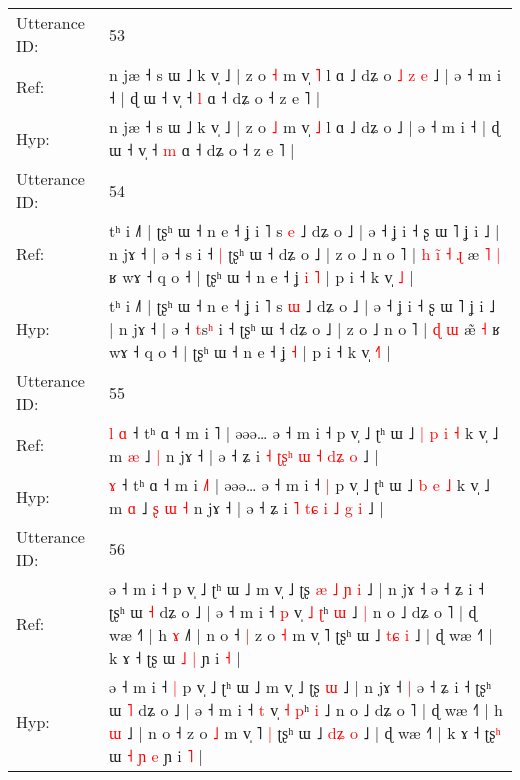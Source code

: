 \documentclass[10pt]{article}
\DeclareRobustCommand{\hl}[1]{{\textcolor{red}{#1}}}
\begin{document}
\begin{longtable}{ll}
 \\
\midrule
Utterance ID: & 53 \\
Ref: & n jæ ˧ s ɯ ˩ k v̩ ˩ | z o \hl{˧} m v̩ \hl{˥} l ɑ ˩ dʑ o\hl{ }\hl{˩}\hl{ }\hl{z}\hl{ }\hl{e} ˩ | ə ˧ m i ˧ | ɖ ɯ ˧ v̩ ˧ \hl{l} ɑ ˧ dʑ o ˧ z e ˥ |
 \\
Hyp: & n jæ ˧ s ɯ ˩ k v̩ ˩ | z o \hl{˩} m v̩ \hl{˩} l ɑ ˩ dʑ o\hl{}\hl{}\hl{}\hl{}\hl{}\hl{} ˩ | ə ˧ m i ˧ | ɖ ɯ ˧ v̩ ˧ \hl{m} ɑ ˧ dʑ o ˧ z e ˥ |
 \\
\midrule
Utterance ID: & 54 \\
Ref: & tʰ i ˩˥ | ʈʂʰ ɯ ˧ n e ˧ ʝ i ˥ s \hl{e} ˩ dʑ o ˩ | ə ˧ ʝ i ˧ ʂ ɯ ˥ ʝ i ˩ | n jɤ ˧ | ə ˧ \hl{}s\hl{} i ˧\hl{ }\hl{|} ʈʂʰ ɯ ˧ dʑ o ˩ | z o ˩ n o ˥ |\hl{ }\hl{h}\hl{ }\hl{i}\hl{̃} \hl{˧} \hl{ɻ} æ\hl{ }\hl{˥} \hl{|} ʁ wɤ ˧ q o ˧ | ʈʂʰ ɯ ˧ n e ˧ ʝ\hl{ }\hl{i} \hl{˥} | p i ˧ k v̩ \hl{}\hl{˩} |
 \\
Hyp: & tʰ i ˩˥ | ʈʂʰ ɯ ˧ n e ˧ ʝ i ˥ s \hl{ɯ} ˩ dʑ o ˩ | ə ˧ ʝ i ˧ ʂ ɯ ˥ ʝ i ˩ | n jɤ ˧ | ə ˧ \hl{t}s\hl{ʰ} i ˧\hl{}\hl{} ʈʂʰ ɯ ˧ dʑ o ˩ | z o ˩ n o ˥ |\hl{}\hl{}\hl{}\hl{}\hl{} \hl{ɖ} \hl{ɯ} æ\hl{}\hl{̃} \hl{˧} ʁ wɤ ˧ q o ˧ | ʈʂʰ ɯ ˧ n e ˧ ʝ\hl{}\hl{} \hl{˧} | p i ˧ k v̩ \hl{˧}\hl{˥} |
 \\
\midrule
Utterance ID: & 55 \\
Ref: & \hl{l}\hl{ }\hl{ɑ} ˧ tʰ ɑ ˧ m i \hl{}˥ | əəə… ə ˧ m i ˧\hl{}\hl{} p v̩ ˩ ʈʰ ɯ ˩\hl{ }\hl{|} \hl{p} \hl{i} \hl{˧} k v̩ ˩ m \hl{æ} ˩\hl{}\hl{}\hl{}\hl{} \hl{|} n jɤ ˧ | ə ˧ ʑ i \hl{˧} \hl{ʈ}\hl{ʂ}\hl{ʰ} \hl{ɯ} \hl{˧} \hl{d}\hl{ʑ} \hl{o} ˩ |
 \\
Hyp: & \hl{}\hl{}\hl{ɤ} ˧ tʰ ɑ ˧ m i \hl{˩}˥ | əəə… ə ˧ m i ˧\hl{ }\hl{|} p v̩ ˩ ʈʰ ɯ ˩\hl{}\hl{} \hl{b} \hl{e} \hl{˩} k v̩ ˩ m \hl{ɑ} ˩\hl{ }\hl{ʂ}\hl{ }\hl{ɯ} \hl{˧} n jɤ ˧ | ə ˧ ʑ i \hl{˥} \hl{}\hl{t}\hl{ɕ} \hl{i} \hl{˩} \hl{}\hl{g} \hl{i} ˩ |
 \\
\midrule
Utterance ID: & 56 \\
Ref: & ə ˧ m i ˧\hl{}\hl{} p v̩ ˩ ʈʰ ɯ ˩ m v̩ ˩ ʈʂ\hl{ }\hl{æ}\hl{ }\hl{˩}\hl{ }\hl{ɲ} \hl{i} ˩ | n jɤ ˧\hl{}\hl{} ə ˧ ʑ i ˧ ʈʂʰ ɯ \hl{˧} dʑ o ˩ | ə ˧ m i ˧ \hl{p} v̩ \hl{˩} \hl{ʈ}ʰ \hl{ɯ} ˩\hl{ }\hl{|} n o ˩ dʑ o ˥ | ɖ wæ ˧˥ | h \hl{ɤ} ˩\hl{˥} | n o ˧\hl{ }\hl{|} z o \hl{˧} m v̩ ˥\hl{}\hl{} ʈʂʰ ɯ ˩ \hl{t}\hl{ɕ} \hl{i} ˩ | ɖ wæ ˧˥ | k ɤ ˧ ʈʂ\hl{} ɯ\hl{}\hl{} \hl{˩} \hl{|} ɲ i \hl{˧} |
 \\
Hyp: & ə ˧ m i ˧\hl{ }\hl{|} p v̩ ˩ ʈʰ ɯ ˩ m v̩ ˩ ʈʂ\hl{}\hl{}\hl{}\hl{}\hl{}\hl{} \hl{ɯ} ˩ | n jɤ ˧\hl{ }\hl{|} ə ˧ ʑ i ˧ ʈʂʰ ɯ \hl{˥} dʑ o ˩ | ə ˧ m i ˧ \hl{t} v̩ \hl{˧} \hl{p}ʰ \hl{i} ˩\hl{}\hl{} n o ˩ dʑ o ˥ | ɖ wæ ˧˥ | h \hl{ɯ} ˩\hl{} | n o ˧\hl{}\hl{} z o \hl{˩} m v̩ ˥\hl{ }\hl{|} ʈʂʰ ɯ ˩ \hl{d}\hl{ʑ} \hl{o} ˩ | ɖ wæ ˧˥ | k ɤ ˧ ʈʂ\hl{ʰ} ɯ\hl{ }\hl{˧} \hl{ɲ} \hl{e} ɲ i \hl{˥} |

\end{longtable}
\end{document}
